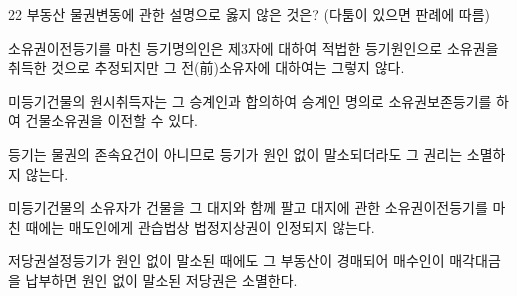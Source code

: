 \begin{question}{22}
부동산 물권변동에 관한 설명으로 옳지 않은 것은? (다툼이 있으면 판례에 따름)
\begin{choices}
  \item 소유권이전등기를 마친 등기명의인은 제3자에 대하여 적법한 등기원인으로 소유권을 취득한 것으로 추정되지만 그 전(前)소유자에 대하여는 그렇지 않다.
  \item 미등기건물의 원시취득자는 그 승계인과 합의하여 승계인 명의로 소유권보존등기를 하여 건물소유권을 이전할 수 있다.
  \item 등기는 물권의 존속요건이 아니므로 등기가 원인 없이 말소되더라도 그 권리는 소멸하지 않는다.
  \item 미등기건물의 소유자가 건물을 그 대지와 함께 팔고 대지에 관한 소유권이전등기를 마친 때에는 매도인에게 관습법상 법정지상권이 인정되지 않는다.
  \item 저당권설정등기가 원인 없이 말소된 때에도 그 부동산이 경매되어 매수인이 매각대금을 납부하면 원인 없이 말소된 저당권은 소멸한다.
\end{choices}
\end{question}
